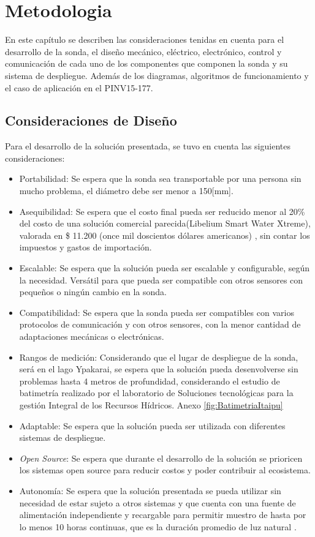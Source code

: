 \chapter[Metodolog\'ia.]{Metodologia}
\pagestyle{fancy}

En este cap\'itulo se describen las consideraciones tenidas en cuenta para el desarrollo de la sonda, el diseño mec\'anico, el\'ectrico, electr\'onico, control y comunicaci\'on de cada uno de los componentes que componen la sonda y su sistema de despliegue. Adem\'as de los diagramas, algoritmos de funcionamiento y el caso de aplicaci\'on en el PINV15-177.

\section[Consideraciones del sistema]{Consideraciones de Dise\~no}
Para el desarrollo de la soluci\'on presentada, se tuvo en cuenta las siguientes consideraciones:
\begin{itemize}
    \item Portabilidad: Se espera que la sonda sea transportable por una persona sin mucho problema, el di\'ametro debe ser menor a 150[mm].
    \item Asequibilidad: Se espera que el costo final pueda ser reducido menor al 20\% del costo de una soluci\'on comercial parecida(Libelium Smart Water Xtreme), valorada en \$ 11.200 (once mil doscientos d\'olares americanos) \cite{storeLibelium}, sin contar los impuestos y gastos de importaci\'on.  
    \item Escalable: Se espera que la soluci\'on pueda ser escalable y configurable, seg\'un la necesidad. Vers\'atil para que pueda ser compatible con otros sensores con peque\~nos o ningún cambio en la sonda.
    \item Compatibilidad: Se espera que la sonda pueda ser compatibles con varios protocolos de comunicaci\'on y con otros sensores, con la menor cantidad de adaptaciones mec\'anicas o electr\'onicas. 
    \item Rangos de medici\'on: Considerando que el lugar de despliegue de la sonda, ser\'a en el lago Ypakarai, se espera que la soluci\'on pueda desenvolverse sin problemas hasta 4 metros de profundidad, considerando el estudio de batimetr\'ia realizado por el laboratorio de Soluciones tecnol\'ogicas para la gesti\'on Integral de los Recursos H\'idricos. Anexo \ref{fig:BatimetriaItaipu}
    \item Adaptable: Se espera que la soluci\'on pueda ser utilizada con diferentes sistemas de despliegue.
    \item \textit{Open Source}: Se espera que durante el desarrollo de la soluci\'on se prioricen los sistemas open source para reducir costos y poder contribuir al ecosistema. 
    \item Autonom\'ia: Se espera que la soluci\'on presentada se pueda utilizar sin necesidad de estar sujeto a otros sistemas y que cuenta con una fuente de alimentaci\'on independiente y recargable para permitir muestro de hasta por lo menos 10 horas continuas, que es la duraci\'on promedio de luz natural \cite{ClimaSol}. 
    
\end{itemize}

